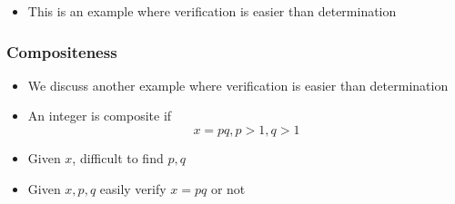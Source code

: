 \begin{frame}[allowframebreaks]
\begin{itemize}
\item This is an example where verification is easier than determination

\end{itemize}\end{frame} \begin{frame}[allowframebreaks] \frametitle{Compositeness}
  \begin{itemize}
  \item We discuss another
    example where verification is easier than determination
  \item An integer is composite if
    \begin{equation*}
    x=pq, p > 1, q > 1
  \end{equation*}
\item Given $x$, difficult to find $p,q$

\item Given $x,p,q$ easily verify $x=pq $ or not
\end{itemize}\end{frame}

